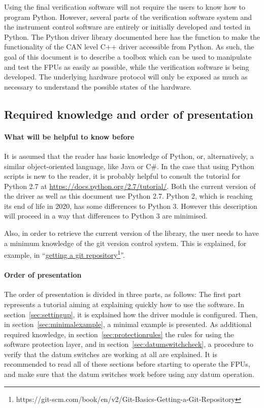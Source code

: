 \documentclass[11pt,a4paper]{scrartcl}
\begin{document}
Using the final verification software will not require the users to
know how to program Python.  However, several parts of the
verification software system and the instrument control software are
entirely or initially developed and tested in Python.  The Python
driver library documented here has the function to make the
functionality of the CAN level C++ driver accessible from Python. As
such, the goal of this document is to describe a toolbox which can be
used to manipulate and test the FPUs as easily as possible, while the
verification software is being developed. The underlying hardware
protocol will only be exposed as much as necessary to understand the
possible states of the hardware.



\subsection{Required knowledge and order of presentation}

\paragraph{What will be helpful to know before}
It is assumed that the reader has basic knowledge of Python, or,
alternatively, a similar object-oriented language, like Java or C\#.
In the case that using Python scripts is new to the reader, it is
probably helpful to consult the tutorial for Python 2.7 at
\url{https://docs.python.org/2.7/tutorial/}.  Both the current version
of the driver as well as this document use Python 2.7. Python 2, which
is reaching its end of life in 2020, has some differences to Python
3. However this description will proceed in a way that differences to
Python 3 are minimised.

Also, in order to retrieve the current version of the library, the
user needs to have a minimum knowledge of the git version control
system. This is explained, for example, in
``\href{https://git-scm.com/book/en/v2/Git-Basics-Getting-a-Git-Repository}{getting
  a git repository}\footnote{https://git-scm.com/book/en/v2/Git-Basics-Getting-a-Git-Repository}''.

\paragraph{Order of presentation}
The order of presentation is divided in three parts, as follows: The
first part represents a tutorial aiming at explaining quickly how to
use the software. In section~\ref{sec:settingup}, it is explained how
the driver module is configured. Then, in
section~\ref{sec:minimalexample}, a minimal example is presented. As
additional required knowledge, in section~\ref{sec:protectionrules}
the rules for using the software protection layer, and in
section~\ref{sec:datumswitchcheck}, a procedure to verify that the
datum switches are working at all are explained. It is recommended to
read all of these sections before starting to operate the FPUs, and
make sure that the datum switches work before using any
datum operation.
\end{document}
